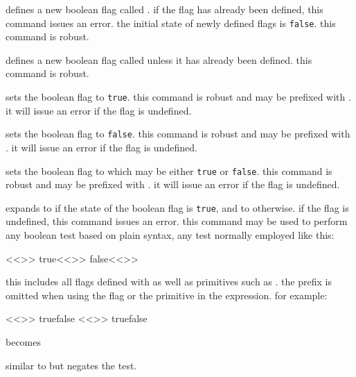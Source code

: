 \begin{ltxsyntax}


defines a new boolean flag called . if the flag has already been defined, this command issues an error. the initial state of newly defined flags is \texttt{false}. this command is robust.


defines a new boolean flag called  unless it has already been defined. this command is robust.


sets the boolean flag  to \texttt{true}. this command is robust and may be prefixed with . it will issue an error if the flag is undefined.


sets the boolean flag  to \texttt{false}. this command is robust and may be prefixed with . it will issue an error if the flag is undefined.


sets the boolean flag  to  which may be either \texttt{true} or \texttt{false}. this command is robust and may be prefixed with . it will issue an error if the flag is undefined.


expands to  if the state of the boolean flag  is \texttt{true}, and to  otherwise. if the flag is undefined, this command issues an error. this command may be used to perform any boolean test based on plain \tex syntax, \ie any test normally employed like this:

\begin{ltxcode}
<<\iftest>> true<<\else>> false<<\fi>>
\end{ltxcode}

this includes all flags defined with  as well as \tex primitives such as . the  prefix is omitted when using the flag or the primitive in the expression. for example:

\begin{ltxcode}
<<\ifmytest>> true\else false\fi
<<\ifmmode>> true\else false\fi
\end{ltxcode}
%
becomes

\begin{ltxcode}
\end{ltxcode}


similar to  but negates the test.

\end{ltxsyntax}

